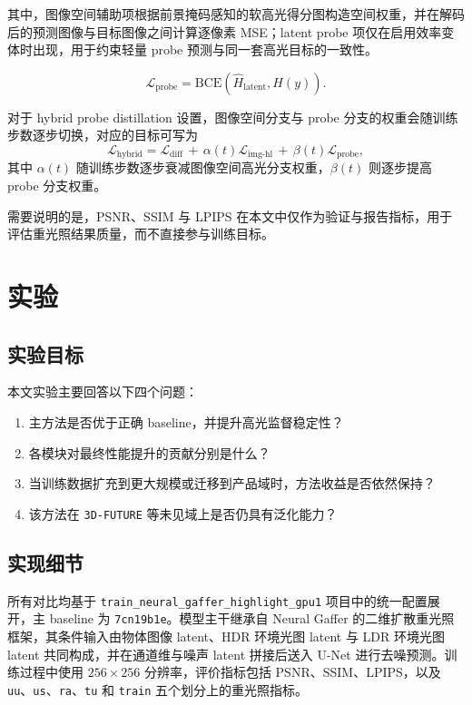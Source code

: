 \documentclass[UTF8,a4paper]{ctexart}
\begin{document}
其中，图像空间辅助项根据前景掩码感知的软高光得分图构造空间权重，并在解码后的预测图像与目标图像之间计算逐像素 MSE；latent probe 项仅在启用效率变体时出现，用于约束轻量 probe 预测与同一套高光目标的一致性。

\begin{equation}
\mathcal{L}_{\text{probe}}=
\text{BCE}\!\left(\hat{H}_{\text{latent}}, H(y)\right).
\end{equation}

对于 hybrid probe distillation 设置，图像空间分支与 probe 分支的权重会随训练步数逐步切换，对应的目标可写为
\begin{equation}
\mathcal{L}_{\text{hybrid}}=
\mathcal{L}_{\text{diff}}
\,+\,\alpha(t)\mathcal{L}_{\text{img-hl}}
\,+\,\beta(t)\mathcal{L}_{\text{probe}},
\end{equation}
其中 $\alpha(t)$ 随训练步数逐步衰减图像空间高光分支权重，$\beta(t)$ 则逐步提高 probe 分支权重。

需要说明的是，PSNR、SSIM 与 LPIPS 在本文中仅作为验证与报告指标，用于评估重光照结果质量，而不直接参与训练目标。

\section{实验}

\subsection{实验目标}

本文实验主要回答以下四个问题：

\begin{enumerate}
\item 主方法是否优于正确 baseline，并提升高光监督稳定性？
\item 各模块对最终性能提升的贡献分别是什么？
\item 当训练数据扩充到更大规模或迁移到产品域时，方法收益是否依然保持？
\item 该方法在 \texttt{3D-FUTURE} 等未见域上是否仍具有泛化能力？
\end{enumerate}

\subsection{实现细节}

所有对比均基于 \texttt{train\_neural\_gaffer\_highlight\_gpu1} 项目中的统一配置展开，主 baseline 为 \texttt{7cn19b1e}。模型主干继承自 Neural Gaffer 的二维扩散重光照框架，其条件输入由物体图像 latent、HDR 环境光图 latent 与 LDR 环境光图 latent 共同构成，并在通道维与噪声 latent 拼接后送入 U-Net 进行去噪预测。训练过程中使用 $256\times256$ 分辨率，评价指标包括 PSNR、SSIM、LPIPS，以及 \texttt{uu}、\texttt{us}、\texttt{ra}、\texttt{tu} 和 \texttt{train} 五个划分上的重光照指标。
\end{document}
